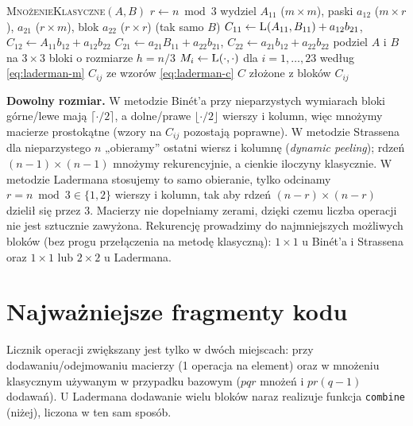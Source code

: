 \documentclass[10pt,a4paper]{article}
\begin{document}
\begin{algorithm}[H]
\caption{\textsc{Laderman}$(A,B)$, $n\times n$ (\textsc{L} = wywołanie rekurencyjne)}
\begin{algorithmic}[1]
 \State \Return \textsc{MnożenieKlasyczne}$(A,B)$ 
\EndIf
\State $r\gets n \bmod 3$
  \State wydziel $A_{11}$ ($m{\times}m$), paski $a_{12}$ ($m{\times}r$), $a_{21}$ ($r{\times}m$), blok $a_{22}$ ($r{\times}r$) (tak samo $B$)
  \State $C_{11}\gets \textsc{L}(A_{11},B_{11})+a_{12}b_{21}$, \; $C_{12}\gets A_{11}b_{12}+a_{12}b_{22}$
  \State $C_{21}\gets a_{21}B_{11}+a_{22}b_{21}$, \; $C_{22}\gets a_{21}b_{12}+a_{22}b_{22}$
\Else
  \State podziel $A$ i $B$ na $3\times3$ bloki o rozmiarze $h=n/3$
  \State $M_i\gets\textsc{L}(\cdot,\cdot)$ dla $i=1,\dots,23$ według \eqref{eq:laderman-m}
  \State $C_{ij}$ ze wzorów \eqref{eq:laderman-c}
\EndIf
\State \Return $C$ złożone z bloków $C_{ij}$
\end{algorithmic}
\end{algorithm}

\textbf{Dowolny rozmiar.} W metodzie Binét'a przy nieparzystych wymiarach bloki górne/lewe mają
$\lceil\cdot/2\rceil$, a dolne/prawe $\lfloor\cdot/2\rfloor$ wierszy i kolumn, więc mnożymy macierze prostokątne
(wzory na $C_{ij}$ pozostają poprawne). W metodzie Strassena dla nieparzystego $n$ „obieramy'' ostatni wiersz
i kolumnę (\emph{dynamic peeling}); rdzeń $(n{-}1)\times(n{-}1)$ mnożymy rekurencyjnie, a cienkie iloczyny
klasycznie. W metodzie Ladermana stosujemy to samo obieranie, tylko odcinamy $r=n\bmod3\in\{1,2\}$ wierszy
i kolumn, tak aby rdzeń $(n{-}r)\times(n{-}r)$ dzielił się przez 3.
Macierzy nie dopełniamy zerami, dzięki czemu liczba operacji nie jest sztucznie zawyżona.
Rekurencję prowadzimy do najmniejszych możliwych bloków (bez progu przełączenia na metodę klasyczną):
$1\times1$ u Binét'a i Strassena oraz $1\times1$ lub $2\times2$ u Ladermana.

\section{Najważniejsze fragmenty kodu}
Licznik operacji zwiększany jest tylko w dwóch miejscach: przy dodawaniu/odejmowaniu macierzy (1 operacja na element)
oraz w mnożeniu klasycznym używanym w przypadku bazowym ($pqr$ mnożeń i $pr(q{-}1)$ dodawań). U Ladermana
dodawanie wielu bloków naraz realizuje funkcja \texttt{combine} (niżej), liczona w ten sam sposób.
\end{document}
